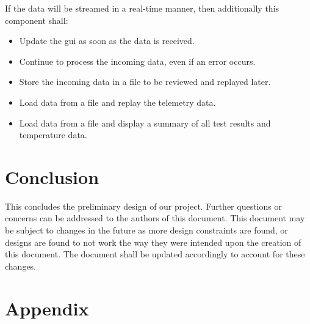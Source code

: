 \documentclass[letterpaper,10pt]{article}
\begin{document}
If the data will be streamed in a real-time manner, then additionally this component shall:
\begin{itemize}
\item Update the \gls{gui} as soon as the data is received.
\item Continue to process the incoming data, even if an error occurs.
\item Store the incoming data in a file to be reviewed and \gls{replay}ed later.
\item Load data from a file and \gls{replay} the telemetry data.
\item Load data from a file and display a summary of all test results and
temperature data.
\end{itemize}

\section{Conclusion}
This concludes the preliminary design of our project. Further questions or concerns can be addressed to the authors of this document.
This document may be subject to changes in the future as more design constraints are found, or designs are found to not work the way
they were intended upon the creation of this document. The document shall be updated accordingly to account for these changes.

\clearpage
\printglossary[numberedsection]

\section{Appendix}

\end{document}
